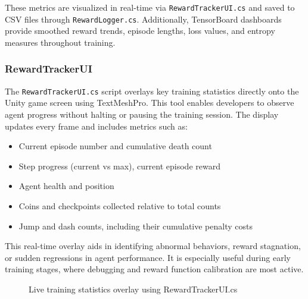 \documentclass[12pt,oneside,openright,a4paper]{cpe-english-project}
\begin{document}
These metrics are visualized in real-time via \texttt{RewardTrackerUI.cs} and saved to CSV files through \texttt{RewardLogger.cs}. Additionally, TensorBoard dashboards provide smoothed reward trends, episode lengths, loss values, and entropy measures throughout training.

\subsubsection{RewardTrackerUI}

The \texttt{RewardTrackerUI.cs} script overlays key training statistics directly onto the Unity game screen using TextMeshPro. This tool enables developers to observe agent progress without halting or pausing the training session. The display updates every frame and includes metrics such as:

\begin{itemize}
\item Current episode number and cumulative death count
\item Step progress (current vs max), current episode reward
\item Agent health and position
\item Coins and checkpoints collected relative to total counts
\item Jump and dash counts, including their cumulative penalty costs
\end{itemize}

This real-time overlay aids in identifying abnormal behaviors, reward stagnation, or sudden regressions in agent performance. It is especially useful during early training stages, where debugging and reward function calibration are most active.

\begin{figure}[H]
\centering
{}
\caption{Live training statistics overlay using RewardTrackerUI.cs}
\label{fig:RewardTrackerUIExample}
\end{figure}
\end{document}
